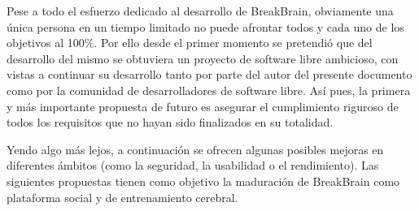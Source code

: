 Pese a todo el esfuerzo dedicado al desarrollo de BreakBrain, obviamente una única persona en un tiempo limitado no puede afrontar todos y cada uno de los objetivos al 100\%. Por ello desde el primer momento se pretendió que del desarrollo del mismo se obtuviera un proyecto de software libre ambicioso, con vistas a continuar su desarrollo tanto por parte del autor del presente documento como por la comunidad de desarrolladores de software libre. Así pues, la primera y más importante propuesta de futuro es asegurar el cumplimiento riguroso de todos los requisitos que no hayan sido finalizados en su totalidad.

Yendo algo más lejos, a continuación se ofrecen algunas posibles mejoras en diferentes ámbitos (como la seguridad, la usabilidad o el rendimiento). Las siguientes propuestas tienen como objetivo la maduración de BreakBrain como plataforma social y de entrenamiento cerebral.

